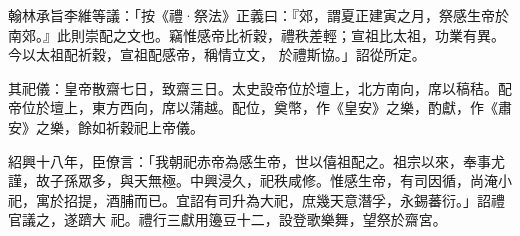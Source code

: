 \begin{pinyinscope}
 翰林承旨李維等議：「按《禮·祭法》正義曰：『郊，謂夏正建寅之月，祭感生帝於南郊。』此則崇配之文也。竊惟感帝比祈穀，禮秩差輕；宣祖比太祖，功業有異。今以太祖配祈穀，宣祖配感帝，稱情立文，
 於禮斯協。」詔從所定。



 其祀儀：皇帝散齋七日，致齋三日。太史設帝位於壇上，北方南向，席以稿秸。配帝位於壇上，東方西向，席以蒲越。配位，奠幣，作《皇安》之樂，酌獻，作《肅安》之樂，餘如祈穀祀上帝儀。



 紹興十八年，臣僚言：「我朝祀赤帝為感生帝，世以僖祖配之。祖宗以來，奉事尤謹，故子孫眾多，與天無極。中興浸久，祀秩咸修。惟感生帝，有司因循，尚淹小祀，寓於招提，酒脯而已。宜詔有司升為大祀，庶幾天意潛孚，永錫蕃衍。」詔禮官議之，遂躋大
 祀。禮行三獻用籩豆十二，設登歌樂舞，望祭於齋宮。



\end{pinyinscope}